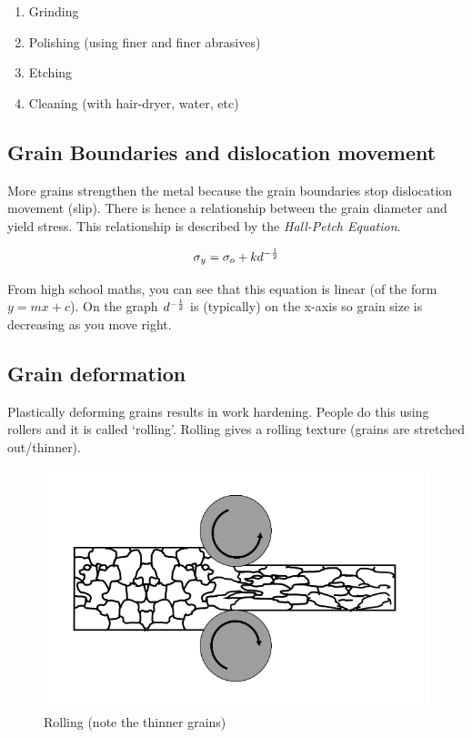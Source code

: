 \documentclass[12pt]{article}
\begin{document}
\begin{enumerate}
  \item Grinding
  \item Polishing (using finer and finer abrasives)
  \item Etching
  \item Cleaning (with hair-dryer, water, etc)
\end{enumerate}

\subsection{Grain Boundaries and dislocation movement}
More grains strengthen the metal because the grain boundaries stop dislocation movement (slip).
There is hence a relationship between the grain diameter and yield stress. 
This relationship is described by the \textit{Hall-Petch Equation}.

\begin{equation*}
  \sigma_y = \sigma_o + kd^{-\frac{1}{2}}
\end{equation*}

From high school maths, you can see that this equation is linear (of the form $y=mx+c$).
On the graph $d^{-\frac{1}{2}}$ is (typically) on the x-axis so grain size is decreasing as you move right.

\subsection{Grain deformation}
Plastically deforming grains results in work hardening.
People do this using rollers and it is called `rolling'. 
Rolling gives a rolling texture (grains are stretched out/thinner).

\begin{center}
\begin{figure}[h]
  \includegraphics[scale=0.5]{rolling}

  \caption{Rolling (note the thinner grains)}
\end{figure}
\end{center}
\end{document}
